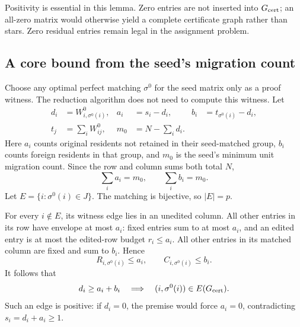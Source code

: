 \documentclass[11pt]{article}
\begin{document}
Positivity is essential in this lemma. Zero entries are not inserted into $G_{\rm cert}$; an all-zero matrix would otherwise yield a complete certificate graph rather than stars. Zero residual entries remain legal in the assignment problem.

\subsection{A core bound from the seed's migration count}
Choose any optimal perfect matching $\sigma^0$ for the seed matrix only as a proof witness. The reduction algorithm does not need to compute this witness. Let
\begin{align}
d_i&=W^0_{i,\sigma^0(i)},&
a_i&=s_i-d_i,&
b_i&=t_{\sigma^0(i)}-d_i,\nonumber\\
t_j&=\sum_i W^0_{ij},&
m_0&=N-\sum_i d_i.
\label{eq:core-flow}
\end{align}
Here $a_i$ counts original residents not retained in their seed-matched group, $b_i$ counts foreign residents in that group, and $m_0$ is the seed's minimum unit migration count. Since the row and column sums both total $N$,
\begin{equation}\label{eq:core-flow-total}
\sum_i a_i=m_0,\qquad \sum_i b_i=m_0.
\end{equation}
Let $E=\{i:\sigma^0(i)\in J\}$. The matching is bijective, so $|E|=p$.

For every $i\notin E$, its witness edge lies in an unedited column. All other entries in its row have envelope at most $a_i$: fixed entries sum to at most $a_i$, and an edited entry is at most the edited-row budget $r_i\le a_i$. All other entries in its matched column are fixed and sum to $b_i$. Hence
\begin{equation}\label{eq:core-witness-bounds}
R_{i,\sigma^0(i)}\le a_i,\qquad C_{i,\sigma^0(i)}\le b_i.
\end{equation}
It follows that
\begin{equation}\label{eq:core-good}
d_i\ge a_i+b_i
\quad\Longrightarrow\quad
(i,\sigma^0(i))\in E(G_{\rm cert}).
\end{equation}
Such an edge is positive: if $d_i=0$, the premise would force $a_i=0$, contradicting $s_i=d_i+a_i\ge1$.
\end{document}
